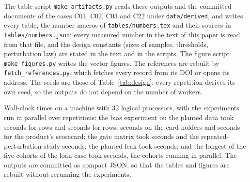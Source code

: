 The table script \texttt{make\_\allowbreak{}artifacts.py} reads these outputs and the committed documents of the cases C01, C02, C03 and C22 under \texttt{data/\allowbreak{}derived}, and writes every table, the number macros of \texttt{tables/\allowbreak{}numbers.tex} and their sources in \texttt{tables/\allowbreak{}numbers.json}; every measured number in the text of this paper is read from that file, and the design constants (sizes of samples, thresholds, perturbation law) are stated in the text and in the scripts. The figure script \texttt{make\_\allowbreak{}figures.py} writes the vector figures. The references are rebuilt by \texttt{fetch\_\allowbreak{}references.py}, which fetches every record from its DOI or opens its address. The seeds are those of Table~\ref{tab:design}; every repetition derives its own seed, so the outputs do not depend on the number of workers.

Wall-clock times on a machine with 32 logical processors, with the experiments run in parallel over repetitions: the bias experiment on the planted data took  seconds for  rows and  seconds for  rows,  seconds on the card holders and  seconds for the product's scorecard; the gate matrix took  seconds and the repeated-perturbation study  seconds; the planted leak took  seconds; and the longest of the five cohorts of the loan case took  seconds, the cohorts running in parallel. The outputs are committed as compact JSON, so that the tables and figures are rebuilt without rerunning the experiments.
